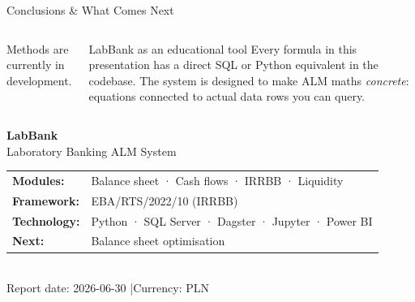 \documentclass[aspectratio=169,10pt]{beamer}
\begin{document}
\begin{frame}{Conclusions \& What Comes Next}
\begin{columns}[T]
      Methods are currently in development.

      \vspace{8pt}
      \begin{exampleblock}{LabBank as an educational tool}
        \small Every formula in this presentation has a direct SQL or
        Python equivalent in the codebase.
        The system is designed to make ALM maths \textit{concrete}:
        equations connected to actual data rows you can query.
      \end{exampleblock}
  \end{columns}
\end{frame}

\begin{frame}[plain]
  \begin{center}
    \vspace{20pt}
    {\Large\textbf{\textcolor{labdark}{LabBank}}}\\[8pt]
    {\large\textcolor{labgrey}{Laboratory Banking ALM System}}\\[20pt]
    \begin{tabular}{ll}
      \textbf{Modules:}    & Balance sheet · Cash flows · IRRBB · Liquidity \\[4pt]
      \textbf{Framework:}  & EBA/RTS/2022/10 (IRRBB) \\[4pt]
      \textbf{Technology:} & Python · SQL Server · Dagster · Jupyter · Power BI \\[4pt]
      \textbf{Next:}       & Balance sheet optimisation \\
    \end{tabular}
    \vspace{20pt}\\
    \textcolor{labgrey}{\small Report date: 2026-06-30 \quad|\quad Currency: PLN}
  \end{center}
\end{frame}
\end{document}
